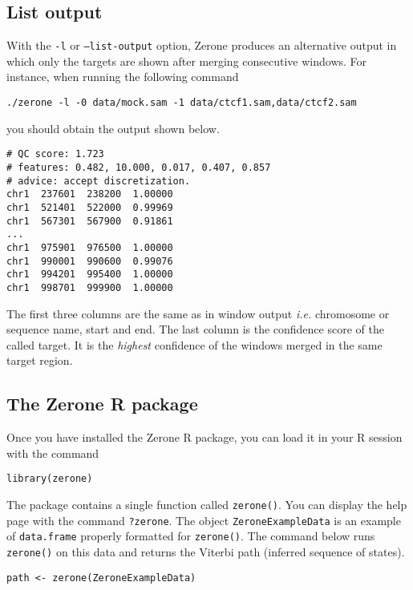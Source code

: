 \documentclass[12pt]{article}
\begin{document}
\subsection{List output}

With the \texttt{-l} or \texttt{--list-output} option, Zerone produces
an alternative output in which only the targets are shown after
merging consecutive windows. For instance, when running the following
command

\begin{verbatim}
./zerone -l -0 data/mock.sam -1 data/ctcf1.sam,data/ctcf2.sam
\end{verbatim}

\noindent
you should obtain the output shown below.

\begin{verbatim}
# QC score: 1.723
# features: 0.482, 10.000, 0.017, 0.407, 0.857
# advice: accept discretization.
chr1  237601  238200  1.00000
chr1  521401  522000  0.99969
chr1  567301  567900  0.91861
...
chr1  975901  976500  1.00000
chr1  990001  990600  0.99076
chr1  994201  995400  1.00000
chr1  998701  999900  1.00000
\end{verbatim}

The first three columns are the same as in window output \textit{i.e.}
chromosome or sequence name, start and end. The last column is the
confidence score of the called target. It is the \textit{highest}
confidence of the windows merged in the same target region.

\subsection*{The Zerone R package}

Once you have installed the Zerone R package, you can load it in
your R session with the command

\begin{verbatim}
library(zerone)
\end{verbatim}

The package contains a single function called \texttt{zerone()}.
You can display the help page with the command \texttt{?zerone}.
The object \texttt{ZeroneExampleData} is an example of
\texttt{data.frame} properly formatted for \texttt{zerone()}.
The command below runs \texttt{zerone()} on this data and
returns the Viterbi path (inferred sequence of states).

\begin{verbatim}
path <- zerone(ZeroneExampleData)
\end{verbatim}
\end{document}
